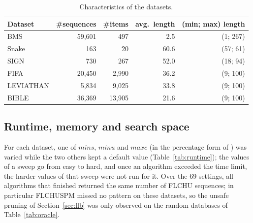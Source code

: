 \documentclass[runningheads]{llncs}
\newcommand{\FL}{\textsc{FLCHUSPM}}
\newcommand{\FX}{\textsc{FLCHUS-X}}
\newcommand{\minu}{\ensuremath{\mathit{minu}}}
\newcommand{\maxc}{\ensuremath{\mathit{maxc}}}
\newcommand{\mins}{\ensuremath{\mathit{mins}}}
\begin{document}
\begin{table}[t]
\centering
\caption{Characteristics of the datasets.}
\label{tab:data}
\begin{tabular}{@{}lrrrr@{}}
\toprule
Dataset & \#sequences & \#items & avg.\ length & (min; max) length \\
\midrule
BMS & 59{,}601 & 497 & 2.5 & (1; 267) \\
Snake & 163 & 20 & 60.6 & (57; 61) \\
SIGN & 730 & 267 & 52.0 & (18; 94) \\
FIFA & 20{,}450 & 2{,}990 & 36.2 & (9; 100) \\
LEVIATHAN & 5{,}834 & 9{,}025 & 33.8 & (9; 100) \\
BIBLE & 36{,}369 & 13{,}905 & 21.6 & (9; 100) \\
\bottomrule
\end{tabular}
\end{table}

\subsection{Runtime, memory and search space}

For each dataset, one of \mins, \minu{} and \maxc{} (in the percentage form of
\cite{truong2022}) was varied while the two others kept a default value
(Table~\ref{tab:runtime}); the values of a sweep go from easy to hard, and once an algorithm
exceeded the time limit, the harder values of that sweep were not run for it. Over the 69
settings, all algorithms that finished returned the same number of FLCHU sequences; in
particular \FL{} missed no pattern on these datasets, so the unsafe pruning of
Section~\ref{sec:flb} was only observed on the random databases of Table~\ref{tab:oracle}.

\begin{table}[t]
\centering
\caption{Median runtime at the default setting (\mins\%, \minu\%, \maxc\%) of each dataset; TL:
time limit of 300\,s exceeded.}
\label{tab:runtime}
\resizebox{\textwidth}{!}{}
\end{table}

\begin{table}[t]
\centering
\caption{Range of the speed-up of \FX{} over the settings of each sweep, and number of settings
solved within the time limit.}
\label{tab:sweeps}
\resizebox{\textwidth}{!}{}
\end{table}
\end{document}
